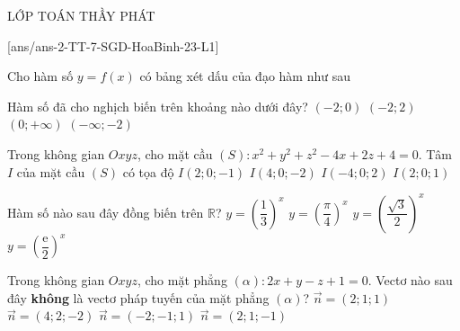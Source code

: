 \begin{name}
	{\tenchude}{\tendethi}{LỚP TOÁN THẦY PHÁT}{\thoigian}
\end{name}
\setcounter{ex}{0}\setcounter{bt}{0}
[ans/ans-2-TT-7-SGD-HoaBinh-23-L1]

\begin{ex}%
	Cho hàm số $y=f(x)$ có bảng xét dấu của đạo hàm như sau
	\begin{center}
	\end{center}
Hàm số đã cho nghịch biến trên khoảng nào dưới đây?
	\choice
	{\True $(-2;0)$}
	{$(-2;2)$}
	{$(0;+\infty)$}
	{$(-\infty;-2)$}

\end{ex}
\begin{ex}%
Trong không gian $Oxyz$, cho mặt cầu $(S) \colon x^2+y^2+z^2-4x+2z+4=0$. Tâm $I$ của mặt cầu $(S)$ có tọa độ
	\choice
{\True $I(2;0;-1)$}
{ $I(4;0;-2)$}
{$I(-4;0;2)$ }
{$I(2;0;1)$}
\end{ex}
\begin{ex}%
	Hàm số nào sau đây đồng biến trên $\mathbb{R}$?
	\choice
	{$y=\left(\dfrac{1}{3}\right)^x$}
	{$y=\left(\dfrac{\pi}{4}\right)^x$}
	{$y=\left(\dfrac{\sqrt{3}}{2}\right)^x$}
	{\True $y=\left(\dfrac{\mathrm{e}}{2}\right)^x$}
\end{ex}
\begin{ex}%
	Trong không gian $Oxyz$, cho mặt phẳng $(\alpha)\colon 2x+y-z+1=0$. Vectơ nào sau đây \textbf{không} là vectơ pháp tuyến của mặt phẳng $(\alpha)$?
	\choice
	{\True $\overrightarrow{n}=(2;1;1)$}
	{$\overrightarrow{n}=(4;2;-2)$}
	{$\overrightarrow{n}=(-2;-1;1)$}
	{$\overrightarrow{n}=(2;1;-1)$}
\end{ex}
